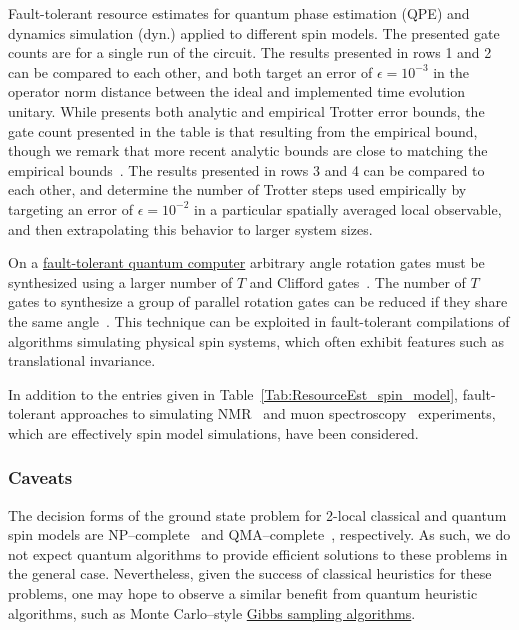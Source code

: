 \begin{refsection}
\begin{savenotes}
\begin{table}[!htb]
{    Fault-tolerant resource estimates for quantum phase estimation (QPE) and dynamics simulation (dyn.) applied to different spin models. The presented gate counts are for a single run of the circuit. The results presented in rows 1 and 2 can be compared to each other, and both target an error of $\epsilon=10^{-3}$ in the operator norm distance between the ideal and implemented time evolution unitary. While \cite{childs2018towardsFirstQSimSpeedup} presents both analytic and empirical Trotter error bounds, the gate count presented in the table is that resulting from the empirical bound, though we remark that more recent analytic bounds are close to matching the empirical bounds~\cite{childs2021TheoryTrotter}. The results presented in rows 3 and 4 can be compared to each other, and determine the number of Trotter steps used empirically by targeting an error of $\epsilon=10^{-2}$ in a particular spatially averaged local observable, and then extrapolating this behavior to larger system sizes. 
    }
\label{Tab:ResourceEst_spin_model}
\end{table}
\end{savenotes}


On a \hyperref[prim:LatticeSurgery]{fault-tolerant quantum computer} arbitrary angle rotation gates must be synthesized using a larger number of $T$ and Clifford gates~\cite{kitaev1997quantumComputationsAlgosQEC}. The number of $T$ gates to synthesize a group of parallel rotation gates can be reduced if they share the same angle~\cite{gidney2018_halving_addition,CampbellHubbard22}. This technique can be exploited in fault-tolerant compilations of algorithms simulating physical spin systems, which often exhibit features such as translational invariance.

In addition to the entries given in Table~\ref{Tab:ResourceEst_spin_model}, fault-tolerant approaches to simulating NMR~\cite{obrien2021NMRsim} and muon spectroscopy~\cite{mcardle2021Muons} experiments, which are effectively spin model simulations, have been considered. 





\subsubsection*{Caveats}
The decision forms of the ground state problem for 2-local classical and quantum spin models are NP--complete~\cite{barahona1982,Lucas2014IsingFormulationNP} and QMA--complete~\cite{kempe2006complexity}, respectively. As such, we do not expect quantum algorithms to provide efficient solutions to these problems in the general case. Nevertheless, given the success of classical heuristics for these problems, one may hope to observe a similar benefit from quantum heuristic algorithms, such as Monte Carlo--style \hyperref[prim:GibbsSampling]{Gibbs sampling algorithms}.


\end{refsection}
